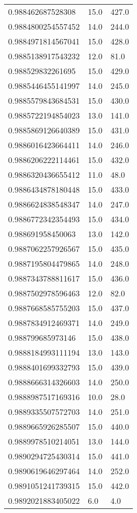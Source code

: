 \begin{center}
\begin{supertabular}[H]{p{0.30\textwidth}p{0.05\textwidth}p{0.05\textwidth}}
0.988462687528308 & 15.0 & 427.0 \\ 
0.9884800254557452 & 14.0 & 244.0 \\ 
0.9884971814567041 & 15.0 & 428.0 \\ 
0.9885138917543232 & 12.0 & 81.0 \\ 
0.988529832261695 & 15.0 & 429.0 \\ 
0.9885446455141997 & 14.0 & 245.0 \\ 
0.9885579843684531 & 15.0 & 430.0 \\ 
0.9885722194854023 & 13.0 & 141.0 \\ 
0.9885869126640389 & 15.0 & 431.0 \\ 
0.9886016423664411 & 14.0 & 246.0 \\ 
0.9886206222114461 & 15.0 & 432.0 \\ 
0.9886320436655412 & 11.0 & 48.0 \\ 
0.9886434878180448 & 15.0 & 433.0 \\ 
0.9886624838548347 & 14.0 & 247.0 \\ 
0.9886772342354493 & 15.0 & 434.0 \\ 
0.988691958450063 & 13.0 & 142.0 \\ 
0.9887062257926567 & 15.0 & 435.0 \\ 
0.9887195804479865 & 14.0 & 248.0 \\ 
0.9887343788811617 & 15.0 & 436.0 \\ 
0.9887502978596463 & 12.0 & 82.0 \\ 
0.9887668585755203 & 15.0 & 437.0 \\ 
0.9887834912469371 & 14.0 & 249.0 \\ 
0.988799685973146 & 15.0 & 438.0 \\ 
0.9888184993111194 & 13.0 & 143.0 \\ 
0.9888401699332793 & 15.0 & 439.0 \\ 
0.9888666314326603 & 14.0 & 250.0 \\ 
0.9888987517169316 & 10.0 & 28.0 \\ 
0.9889335507572703 & 14.0 & 251.0 \\ 
0.9889665926285507 & 15.0 & 440.0 \\ 
0.9889978510214051 & 13.0 & 144.0 \\ 
0.9890294725430314 & 15.0 & 441.0 \\ 
0.9890619646297464 & 14.0 & 252.0 \\ 
0.9891051241739315 & 15.0 & 442.0 \\ 
0.9892021883405022 & 6.0 & 4.0 \\ 

\end{supertabular}
\end{center}
